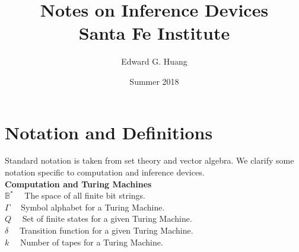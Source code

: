 \documentclass[11pt]{article}
\title{
  Notes on Inference Devices \\
  \large Santa Fe Institute}
\author{Edward G. Huang}
\date{Summer 2018}
\newcommand{\B}{\mathbb{B}}
\begin{document}
\maketitle 


\section{Notation and Definitions} 

Standard notation is taken from set theory and vector algebra. We clarify some notation specific to computation and inference devices. \\


\textbf{Computation and Turing Machines} \\
$ \B^{*} \quad $ The space of all finite bit strings. \\
$ \Gamma \quad $ Symbol alphabet for a Turing Machine. \\
$ Q \quad $ Set of finite states for a given Turing Machine. \\
$ \delta \quad $ Transition function for a given Turing Machine. \\
$ k \quad $ Number of tapes for a Turing Machine. \\
\end{document}
